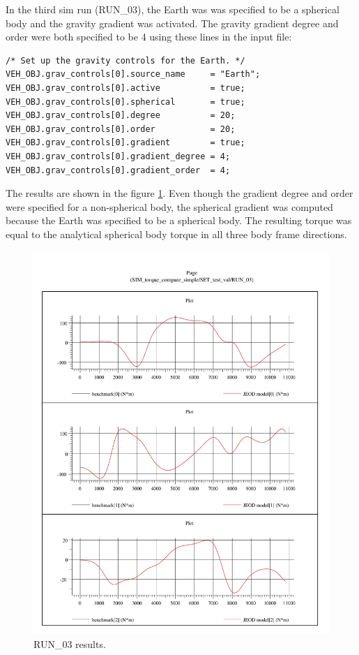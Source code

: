 In the third sim run (RUN\_03), the Earth was  was specified to be a
spherical body and the gravity gradient was activated.  The gravity
gradient degree and order were both specified to be 4 using these 
lines in the input file:
\begin{verbatim}
/* Set up the gravity controls for the Earth. */
VEH_OBJ.grav_controls[0].source_name     = "Earth";
VEH_OBJ.grav_controls[0].active          = true;
VEH_OBJ.grav_controls[0].spherical       = true;
VEH_OBJ.grav_controls[0].degree          = 20;
VEH_OBJ.grav_controls[0].order           = 20;
VEH_OBJ.grav_controls[0].gradient        = true;
VEH_OBJ.grav_controls[0].gradient_degree = 4;
VEH_OBJ.grav_controls[0].gradient_order  = 4;
\end{verbatim}
The results are shown in the figure \ref{fig:run03_results}.
Even though the gradient degree and order were specified for a non-spherical
body, the spherical gradient was computed because the Earth was
specified to be a spherical body.  
The resulting torque was equal to the analytical spherical body
torque in all three body frame directions.
\begin{figure}[h!]
\centering
\includegraphics[width=6.1in]{figs/run_03.pdf}
\caption{RUN\_03 results.}
\label{fig:run03_results}
\end{figure}
\newpage

